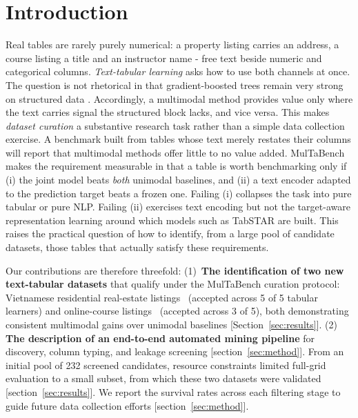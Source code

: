 \documentclass{article}
\begin{document}
\section{Introduction}

Real tables are rarely purely numerical: a property listing carries an address, a course
listing a title and an instructor name - free text beside numeric and categorical columns.
\emph{Text-tabular learning} asks how to use both channels at once. The question is not
rhetorical in that gradient-boosted trees remain very strong on structured data
\cite{grinsztajn,shwartzziv}. Accordingly, a multimodal method provides value only where
the text carries signal the structured block lacks, and vice versa. This makes \emph{dataset curation} a substantive research task rather than a simple data collection exercise. A benchmark
built from tables whose text merely restates their columns will report that multimodal methods offer little to no value added. MulTaBench \cite{multabench}
makes the requirement measurable in that a table is worth benchmarking only if (i) the joint model
beats \emph{both} unimodal baselines, and (ii) a text encoder adapted to the prediction target
beats a frozen one. Failing (i) collapses the task into pure tabular or pure NLP. Failing (ii)
exercises text encoding but not the target-aware representation learning around which models such as
TabSTAR \cite{tabstar} are built. This raises the practical question of how to identify, from a large pool of candidate datasets, those tables that actually satisfy these requirements.

Our contributions are therefore threefold: 
(1)~\textbf{The identification of two new text-tabular datasets} that qualify under the MulTaBench curation protocol: Vietnamese residential real-estate listings~\cite{dataset_vietnam_housing} (accepted across 5 of 5 tabular learners) and online-course listings~\cite{dataset_udemy_courses} (accepted across 3 of 5), both demonstrating consistent multimodal gains over unimodal baselines [Section~\ref{sec:results}].
(2)~\textbf{ The description of an end-to-end automated mining pipeline} for discovery, column typing, and leakage screening [section~\ref{sec:method}]. From an initial pool of 232 screened candidates, resource constraints limited full-grid evaluation to a small subset, from which these two datasets were validated [section~\ref{sec:results}]. We report the survival rates across each filtering stage to guide future data collection efforts [section~\ref{sec:method}].

\vfill
\end{document}
